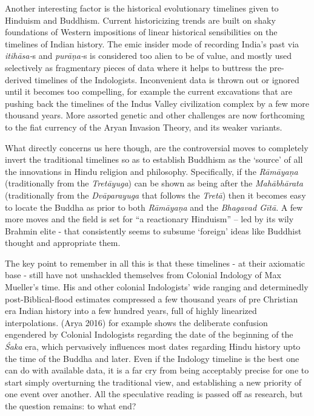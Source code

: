 Another interesting factor is the historical evolutionary timelines given to Hinduism and Buddhism. Current historicizing trends are built on shaky foundations of Western impositions of linear historical sensibilities on the timelines of Indian history. The emic insider mode of recording India’s past via \textit{itihāsa-}s and \textit{purāṇa-}s is considered too alien to be of value, and mostly used selectively as fragmentary pieces of data where it helps to buttress the pre-derived timelines of the Indologists. Inconvenient data is thrown out or ignored until it becomes too compelling, for example the current excavations that are pushing back the timelines of the Indus Valley civilization complex by a few more thousand years. More assorted genetic and other challenges are now forthcoming to the fiat currency of the Aryan Invasion Theory, and its weaker variants.

What directly concerns us here though, are the controversial moves to completely invert the traditional timelines so as to establish Buddhism as the ‘source’ of all the innovations in Hindu religion and philosophy. Specifically, if the \textit{Rāmāyaṇa} (traditionally from the \textit{Tretāyuga}) can be shown as being after the \textit{Mahābhārata} (traditionally from the \textit{Dvāparayuga} that follows the \textit{Tretā}) then it becomes easy to locate the Buddha as prior to both \textit{Rāmāyaṇa} and the \textit{Bhagavad Gītā}. A few more moves and the field is set for “a reactionary Hinduism” – led by its wily Brahmin elite - that consistently seems to subsume ‘foreign’ ideas like Buddhist thought and appropriate them.

The key point to remember in all this is that these timelines - at their axiomatic base - still have not unshackled themselves from Colonial Indology of Max Mueller’s time. His and other colonial Indologists’ wide ranging and determinedly post-Biblical-flood estimates compressed a few thousand years of pre Christian era Indian history into a few hundred years, full of highly linearized interpolations. (Arya 2016) for example shows the deliberate confusion engendered by Colonial Indologists regarding the date of the beginning of the \textit{Śaka} era, which pervasively influences most dates regarding Hindu history upto the time of the Buddha and later. Even if the Indology timeline is the best one can do with available data, it is a far cry from being acceptably precise for one to start simply overturning the traditional view, and establishing a new priority of one event over another. All the speculative reading is passed off as research, but the question remains: to what end?

